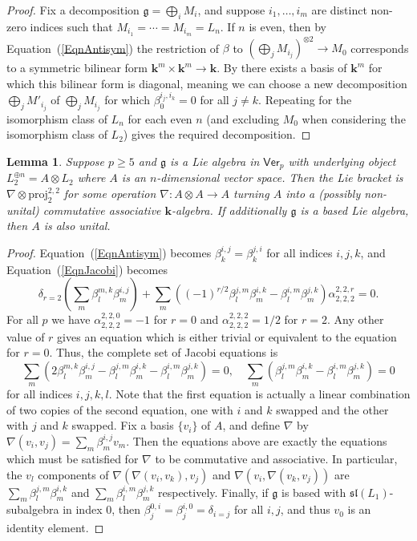 \documentclass[11pt,a4paper,reqno]{amsart}
\newtheorem{lemma}[theorem]{Lemma}
\theoremstyle{definition}
\newcommand{\bk}{\mathbf{k}}
\numberwithin{equation}{section}
\newcommand{\Ver}{\mathsf{Ver}}
\newcommand{\fg}{\mathfrak{g}}
\newcommand{\fsl}{\mathfrak{sl}}
\newcommand{\proj}{\mathrm{proj}}
\begin{document}
\begin{proof}
Fix a decomposition $\fg=\bigoplus_i M_i$, and suppose $i_1,\dots,i_m$ are distinct non-zero indices such that $M_{i_1}=\cdots=M_{i_m}=L_n$. If $n$ is even, then by Equation~(\ref{EqnAntisym}) the restriction of $\beta$ to $(\bigoplus_j M_{i_j})^{\otimes2}\to M_0$ corresponds to a symmetric bilinear form $\bk^m\times\bk^m\to\bk$. By \cite[Theorem~6.5]{Jac} there exists a basis of $\bk^m$ for which this bilinear form is diagonal, meaning we can choose a new decomposition $\bigoplus_j M'_{i_j}$ of $\bigoplus_j M_{i_j}$ for which $\beta^{i_j,i_k}_0=0$ for all $j\neq k$. Repeating for the isomorphism class of $L_n$ for each even $n$ (and excluding $M_0$ when considering the isomorphism class of $L_2$) gives the required decomposition.
\end{proof}

\begin{lemma}\label{LemL2Alg}
Suppose $p\geq5$ and $\fg$ is a Lie algebra in $\Ver_p$ with underlying object $L_2^{\oplus n}=A\otimes L_2$ where $A$ is an $n$-dimensional vector space. Then the Lie bracket is $\nabla\otimes\proj^{2,2}_2$ for some operation $\nabla:A\otimes A\to A$ turning $A$ into a (possibly non-unital) commutative associative $\bk$-algebra. If additionally $\fg$ is a based Lie algebra, then $A$ is also unital.
\end{lemma}

\begin{proof}
Equation~(\ref{EqnAntisym}) becomes $\beta^{i,j}_k=\beta^{j,i}_k$ for all indices $i,j,k$, and Equation~(\ref{EqnJacobi}) becomes
\[\delta_{r=2}\left(\sum_m\beta^{m,k}_l\beta^{i,j}_m\right)+\sum_m\left((-1)^{r/2}\beta^{j,m}_l\beta^{i,k}_m-\beta^{i,m}_l\beta^{j,k}_m\right)\alpha^{2,2,r}_{2,2,2}=0.\]
For all $p$ we have $\alpha^{2,2,0}_{2,2,2}=-1$ for $r=0$ and $\alpha^{2,2,2}_{2,2,2}=1/2$ for $r=2$. Any other value of $r$ gives an equation which is either trivial or equivalent to the equation for $r=0$. Thus, the complete set of Jacobi equations is
\[\sum_m\left(2\beta^{m,k}_l\beta^{i,j}_m-\beta^{j,m}_l\beta^{i,k}_m-\beta^{i,m}_l\beta^{j,k}_m\right)=0,\quad
\sum_m\left(\beta^{j,m}_l\beta^{i,k}_m-\beta^{i,m}_l\beta^{j,k}_m\right)=0\]
for all indices $i,j,k,l$. Note that the first equation is actually a linear combination of two copies of the second equation, one with $i$ and $k$ swapped and the other with $j$ and $k$ swapped. Fix a basis $\{v_i\}$ of $A$, and define $\nabla$ by $\nabla(v_i,v_j)=\sum_m\beta^{i,j}_m v_m$. Then the equations above are exactly the equations which must be satisfied for $\nabla$ to be commutative and associative. In particular, the $v_l$ components of $\nabla(\nabla(v_i,v_k),v_j)$ and $\nabla(v_i,\nabla(v_k,v_j))$ are $\sum_m\beta^{j,m}_l\beta^{i,k}_m$ and $\sum_m\beta^{i,m}_l\beta^{j,k}_m$ respectively. Finally, if $\fg$ is based with $\fsl(L_1)$-subalgebra in index 0, then $\beta^{0,i}_j=\beta^{i,0}_j=\delta_{i=j}$ for all $i,j$, and thus $v_0$ is an identity element.
\end{proof}
\end{document}
